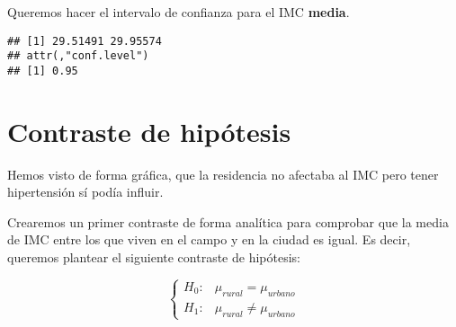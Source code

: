 \documentclass[
]{article}
\newenvironment{Shaded}{\begin{snugshade}}{\end{snugshade}}
\newcommand{\AttributeTok}[1]{\textcolor[rgb]{0.77,0.63,0.00}{#1}}
\newcommand{\CommentTok}[1]{\textcolor[rgb]{0.56,0.35,0.01}{\textit{#1}}}
\newcommand{\ConstantTok}[1]{\textcolor[rgb]{0.00,0.00,0.00}{#1}}
\newcommand{\FloatTok}[1]{\textcolor[rgb]{0.00,0.00,0.81}{#1}}
\newcommand{\FunctionTok}[1]{\textcolor[rgb]{0.00,0.00,0.00}{#1}}
\newcommand{\NormalTok}[1]{#1}
\newcommand{\OtherTok}[1]{\textcolor[rgb]{0.56,0.35,0.01}{#1}}
\newcommand{\SpecialCharTok}[1]{\textcolor[rgb]{0.00,0.00,0.00}{#1}}
\newcommand{\StringTok}[1]{\textcolor[rgb]{0.31,0.60,0.02}{#1}}
\begin{document}
Queremos hacer el intervalo de confianza para el IMC \textbf{media}.

\begin{Shaded}
\end{Shaded}

\begin{verbatim}
## [1] 29.51491 29.95574
## attr(,"conf.level")
## [1] 0.95
\end{verbatim}

\hypertarget{contraste-de-hipuxf3tesis}{%
\section{Contraste de hipótesis}\label{contraste-de-hipuxf3tesis}}

Hemos visto de forma gráfica, que la residencia no afectaba al IMC pero
tener hipertensión sí podía influir.

Crearemos un primer contraste de forma analítica para comprobar que la
media de IMC entre los que viven en el campo y en la ciudad es igual. Es
decir, queremos plantear el siguiente contraste de hipótesis:

\[ \left\{ \begin{array}{lc}
             H_{0}: & \mu_{rural} = \mu_{urbano} \\
             H_{1}: & \mu_{rural} \neq \mu_{urbano}
             \end{array}
\right. \]
\end{document}
